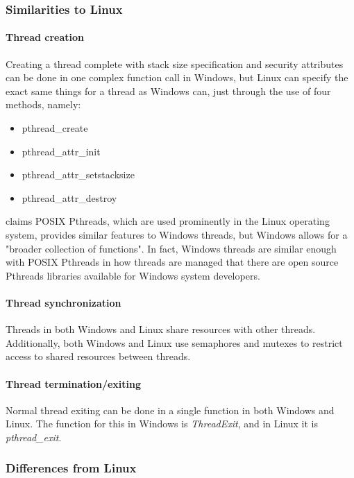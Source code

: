 \documentclass[letterpaper,10pt,titlepage]{article}
\begin{document}
\subsubsection{Similarities to Linux}
\paragraph{Thread creation}
Creating a thread complete with stack size specification and security attributes can be done in one complex function call in Windows, but Linux can specify the exact same things for a thread as Windows can, just through the use of four methods, namely:
\begin{itemize}
\item pthread\_create
\item pthread\_attr\_init
\item pthread\_attr\_setstacksize
\item pthread\_attr\_destroy
\end{itemize}
\cite{har04} claims POSIX Pthreads, which are used prominently in the Linux operating system, provides similar features to Windows threads, but Windows allows for a "broader collection of functions". In fact, Windows threads are similar enough with POSIX Pthreads in how threads are managed that there are open source Pthreads libraries available for Windows system developers.
\paragraph{Thread synchronization}
Threads in both Windows and Linux share resources with other threads. Additionally, both Windows and Linux use semaphores and mutexes to restrict access to shared resources between threads.
\paragraph{Thread termination/exiting}
Normal thread exiting can be done in a single function in both Windows and Linux. The function for this in Windows is \emph{ThreadExit}, and in Linux it is \emph{pthread\_exit}.

\subsubsection{Differences from Linux}
\end{document}
